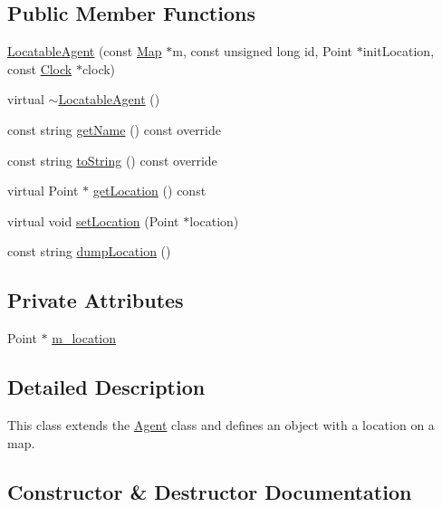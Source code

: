 \subsection*{Public Member Functions}
\begin{DoxyCompactItemize}
\item 
\mbox{\hyperlink{class_locatable_agent_ab4939cf1ef1352acdac76736bfe47fc7}{Locatable\+Agent}} (const \mbox{\hyperlink{class_map}{Map}} $\ast$m, const unsigned long id, Point $\ast$init\+Location, const \mbox{\hyperlink{class_clock}{Clock}} $\ast$clock)
\item 
virtual \mbox{\hyperlink{class_locatable_agent_ad721398f0b4e841aad377cd91a7f5e3a}{$\sim$\+Locatable\+Agent}} ()
\item 
const string \mbox{\hyperlink{class_locatable_agent_a754105958bb672744b525538f1584a7b}{get\+Name}} () const override
\item 
const string \mbox{\hyperlink{class_locatable_agent_a88674f4c8ab9b1b2f3986b226bf4244f}{to\+String}} () const override
\item 
virtual Point $\ast$ \mbox{\hyperlink{class_locatable_agent_ad779af171c67ce0d478fc79b904e2d90}{get\+Location}} () const
\item 
virtual void \mbox{\hyperlink{class_locatable_agent_a754b237c404b77714fedd397f214bc02}{set\+Location}} (Point $\ast$location)
\item 
const string \mbox{\hyperlink{class_locatable_agent_af9a6dbd25b47c23a71c95b205da3a28d}{dump\+Location}} ()
\end{DoxyCompactItemize}
\subsection*{Private Attributes}
\begin{DoxyCompactItemize}
\item 
Point $\ast$ \mbox{\hyperlink{class_locatable_agent_a2a76ba315733ab26f19229a71071704d}{m\+\_\+location}}
\end{DoxyCompactItemize}


\subsection{Detailed Description}
This class extends the \mbox{\hyperlink{class_agent}{Agent}} class and defines an object with a location on a map. 

\subsection{Constructor \& Destructor Documentation}
\mbox{\label{class_locatable_agent_ab4939cf1ef1352acdac76736bfe47fc7}} 
